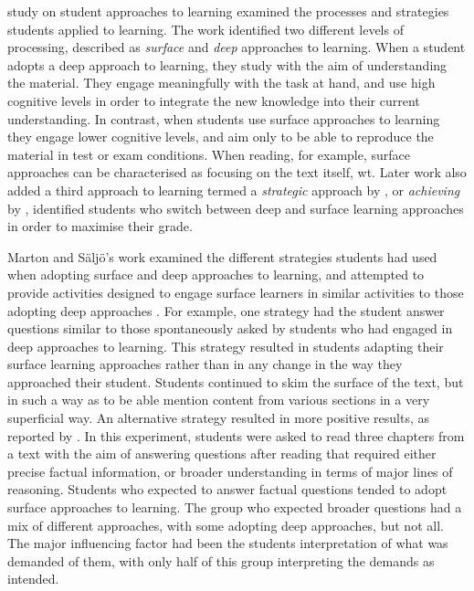 \citet{Marton:1976a, Marton:1976b,Marton:2005} study on student approaches to learning examined the processes and strategies students applied to learning. The work identified two different levels of processing, described as \emph{surface} and \emph{deep} approaches to learning. When a student adopts a deep approach to learning, they study with the aim of understanding the material. They engage meaningfully with the task at hand, and use high cognitive levels in order to integrate the new knowledge into their current understanding. In contrast, when students use surface approaches to learning they engage lower cognitive levels, and aim only to be able to reproduce the material in test or exam conditions. When reading, for example, surface approaches can be characterised as focusing on the text itself, wt. Later work also added a third approach to learning termed a \emph{strategic} approach by \citet{Ramsden:1983}, or \emph{achieving} by  \citet{Biggs:1987}, identified students who switch between deep and surface learning approaches in order to maximise their grade. 

Marton and S\"{a}lj\"{o}'s work examined the different strategies students had used when adopting surface and deep approaches to learning, and attempted to provide activities designed to engage surface learners in similar activities to those adopting deep approaches \cite{Marton:2005}. For example, one strategy had the student answer questions similar to those spontaneously asked by students who had engaged in deep approaches to learning.  This strategy resulted in students adapting their surface learning approaches rather than in any change in the way they approached their student. Students continued to skim the surface of the text, but in such a way as to be able mention content from various sections in a very superficial way. An alternative strategy resulted in more positive results, as reported by \cite{Marton:1976b}. In this experiment, students were asked to read three chapters from a text with the aim of answering questions after reading that required either precise factual information, or broader understanding in terms of major lines of reasoning. Students who expected to answer factual questions tended to adopt surface approaches to learning. The group who expected broader questions had a mix of different approaches, with some adopting deep approaches, but not all. The major influencing factor had been the students interpretation of what was demanded of them, with only half of this group interpreting the demands as intended. 


